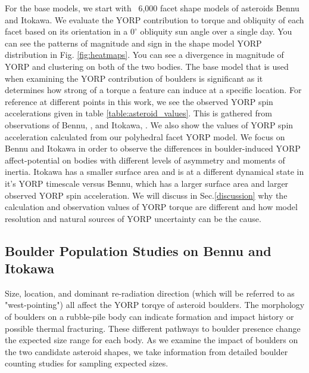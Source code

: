 For the base models, we start with ~6,000 facet shape models of asteroids Bennu and Itokawa. We evaluate the YORP contribution to torque and obliquity of each facet based on its orientation in a $0^{\circ}$ obliquity sun angle over a single day. You can see the patterns of magnitude and sign in the shape model YORP distribution in Fig. \ref{fig:heatmaps}. You can see a divergence in magnitude of YORP and clustering on both of the two bodies. The base model that is used when examining the YORP contribution of boulders is significant as it determines how strong of a torque a feature can induce at a specific location. For reference at different points in this work, we see the observed YORP spin accelerations given in table \ref{table:asteroid_values}. This is gathered from observations of Bennu, \citep{Daly2020} \citep{Scheeres2016} \citep{Hergenrother2019}, and Itokawa, \citep{Fujiwara2006} \citep{Lowry2007} \citep{Breiter2009}. We also show the values of YORP spin acceleration calculated from our polyhedral facet YORP model. We focus on Bennu and Itokawa in order to observe the differences in boulder-induced YORP affect-potential on bodies with different levels of asymmetry and moments of inertia. Itokawa has a smaller surface area and is at a different dynamical state in it's YORP timescale versus Bennu, which has a larger surface area and larger observed YORP spin acceleration. We will discuss in Sec.\ref{discussion} why the calculation and observation values of YORP torque are different and how model resolution and natural sources of YORP uncertainty can be the cause.


\subsection{Boulder Population Studies on Bennu and Itokawa} \label{BP}

Size, location, and dominant re-radiation direction (which will be referred to as "west-pointing") all affect the YORP torqye of asteroid boulders. The morphology of boulders on a rubble-pile body can indicate formation and impact history or possible thermal fracturing. These different pathways to boulder presence change the expected size range for each body. As we examine the impact of boulders on the two candidate asteroid shapes, we take information from detailed boulder counting studies for sampling expected sizes. 


